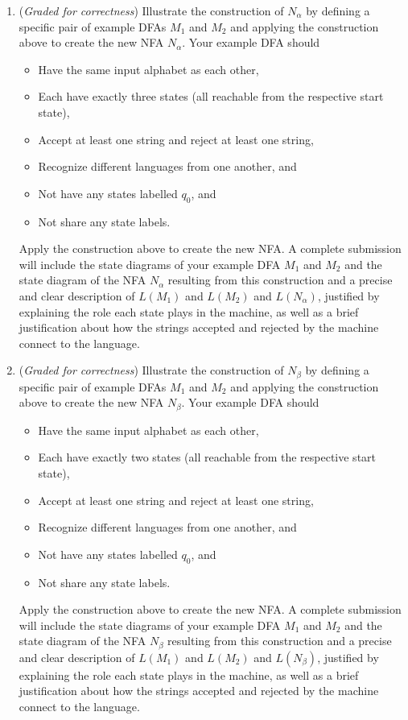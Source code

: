 \documentclass[12pt, oneside]{article}
\newcommand{\gradeCorrect}{({\it Graded for correctness}) }
\begin{document}
\begin{enumerate}[wide, labelwidth=!, labelindent=0pt]
\begin{enumerate}
\item\gradeCorrect 
Illustrate the construction of $N_{\alpha}$ by defining a specific pair 
of example DFAs $M_1$ and $M_2$ and applying the 
construction above to create the new NFA $N_\alpha$. Your example DFA should
\begin{itemize}
    \item Have the same input alphabet as each other, 
    \item Each have exactly three states (all reachable from the respective start state),
    \item Accept at least one string and reject at least one string, 
    \item Recognize different languages from one another, and
    \item Not have any states labelled $q_0$, and 
    \item Not share any state labels.
\end{itemize}
Apply the construction above to create the new NFA. A complete submission 
will include the state diagrams of your example DFA $M_1$ and $M_2$ and the state diagram of the NFA $N_\alpha$ resulting 
from this construction and a precise and clear description of $L(M_1)$ and $L(M_2)$ and $L(N_{\alpha})$, justified
by explaining the role each state plays in the machine, as well as a brief 
justification about how the strings accepted and rejected by the machine connect to the language.

\item\gradeCorrect 
Illustrate the construction of $N_{\beta}$ by defining a specific pair 
of example DFAs $M_1$ and $M_2$ and applying the 
construction above to create the new NFA $N_\beta$. Your example DFA should
\begin{itemize}
    \item Have the same input alphabet as each other, 
    \item Each have exactly two states (all reachable from the respective start state),
    \item Accept at least one string and reject at least one string, 
    \item Recognize different languages from one another, and
    \item Not have any states labelled $q_0$, and 
    \item Not share any state labels.
\end{itemize}
Apply the construction above to create the new NFA. A complete submission 
will include the state diagrams of your example DFA $M_1$ and $M_2$ and the state diagram of the NFA $N_\beta$ resulting 
from this construction and a precise and clear description of $L(M_1)$ and $L(M_2)$ and $L(N_{\beta})$, justified
by explaining the role each state plays in the machine, as well as a brief 
justification about how the strings accepted and rejected by the machine connect to the language.



\end{enumerate}
\end{enumerate}
\end{document}

